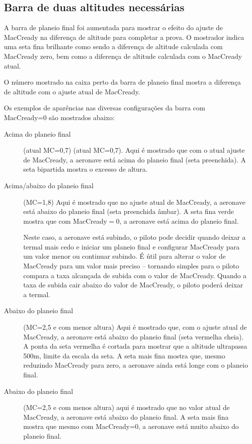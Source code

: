 \subsection*{Barra de duas altitudes necessárias}

A barra de planeio final foi aumentada para mostrar o efeito do ajuste de MacCready na diferença de altitude para completar a prova.  O mostrador indica uma seta fina brilhante como sendo a diferença de altitude calculada com MacCready zero, bem como a diferença de altitude calculada com o MacCready atual.  

O número mostrado na caixa perto da barra de planeio final mostra a diferença de altitude com o ajuste atual de MacCready.

Os exemplos de aparências nas diversas configurações da barra com MacCready=0 são mostrados abaixo:

\begin{description}
\item[Acima do planeio final] (atual MC=0,7)
 (atual MC=0,7).  Aqui é mostrado que com o atual ajuste de MacCready, a aeronave está acima do planeio final (seta preenchida).  A seta bipartida mostra o excesso de altura.

\item[Acima/abaixo do planeio final] (MC=1,8)
  Aqui é mostrado que no ajuste atual de MacCready, a aeronave está abaixo do planeio final (seta preenchida âmbar).  A seta fina verde mostra que com MacCready$=0$, a aeronave está acima do planeio final. 

 Neste caso, a aeronave está subindo, o piloto pode decidir quando deixar a termal mais cedo e iniciar um planeio final e configurar MacCready para um valor menor ou continuar subindo.  É útil para alterar o valor de MacCready para um valor mais preciso – tornando simples para o piloto compara a taxa alcançada de subida com o valor de MacCready.  Quando a taxa de subida cair abaixo do valor de MacCready, o piloto poderá deixar a termal.

\item[Abaixo do planeio final] (MC=2,5 e com menor altura)
Aqui é mostrado que, com o ajuste atual de MacCready, a aeronave está abaixo do planeio final (seta vermelha cheia).  A ponta da seta vermelha é cortada para mostrar que a altitude ultrapassa 500m, limite da escala da seta.  A seta mais fina mostra que, mesmo reduzindo MacCready para zero, a aeronave ainda está longe com o planeio final.

\item[Abaixo do planeio final] 
 (MC=2,5 e com menos altura) aqui é mostrado que no valor atual de MacCready, a aeronave está abaixo do planeio final.  A seta mais fina
 mostra que mesmo com MacCready=0, a aeronave está muito abaixo do planeio final.
\end{description}


